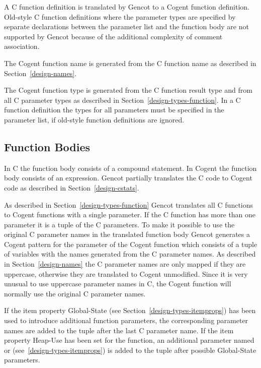
A C function definition is translated by Gencot to a Cogent function definition. Old-style C function definitions
where the parameter types are specified by separate declarations between the parameter list and the function body
are not supported by Gencot because of the additional complexity of comment association.

The Cogent function name is generated from the C function name as described in Section~\ref{design-names}.

The Cogent function type is generated from the C function result type and from all C parameter types as described
in Section~\ref{design-types-function}. In a C
function definition the types for all parameters must be specified in the parameter list, if old-style function
definitions are ignored.

\subsection{Function Bodies}
\label{design-fundefs-body}

In C the function body consists of a compound statement. In Cogent
the function body consists of an expression. Gencot partially translates the C code to Cogent code as described 
in Section~\ref{design-cstats}.

As described in Section~\ref{design-types-function} Gencot translates all C functions to Cogent functions with
a single parameter. If the C function has more than one parameter it is a tuple of the C parameters. To make it
possible to use the original C parameter names in the translated function body
Gencot generates a Cogent pattern for the parameter of the Cogent function which 
consists of a tuple of variables with the names generated from the C parameter names. As described in 
Section~\ref{design-names} the C parameter names are only mapped if they are uppercase, otherwise they are
translated to Cogent unmodified. Since it is very unusual
to use uppercase parameter names in C, the Cogent function will normally use the original C parameter names.

If the item property Global-State (see Section~\ref{design-types-itemprops}) has been used to introduce additional 
function parameters, the corresponding parameter names are added to the tuple after the last C parameter name.
If the item property Heap-Use has been set for the function, an additional parameter named  or 
 (see~\ref{design-types-itemprops}) is added to the tuple after possible Global-State parameters.

